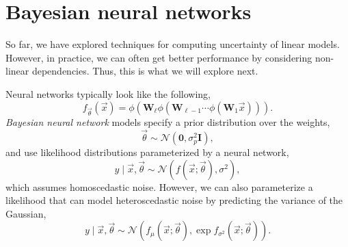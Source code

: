\section{Bayesian neural networks}

So far, we have explored techniques for computing uncertainty of linear
models. However, in practice, we can often get better performance by
considering non-linear dependencies. Thus, this is what we will explore next.

Neural networks typically look like the following, \[
  f_{\vec{\theta}}(\vec{x}) = \phi(\bm{W}_\ell \phi(\bm{W}_{\ell-1} \cdots \phi(\bm{W}_1\vec{x})))
.\]
\textit{Bayesian neural network} models specify a prior distribution over the
weights, \[
  \vec{\theta} \sim \mathcal{N}(\bm{0}, \sigma_p^2\bm{I})
,\]
and use likelihood distributions parameterized by a neural network, \[
  y\mid \vec{x},\vec{\theta} \sim \mathcal{N}(f(\vec{x};\vec{\theta}), \sigma^2)
,\]
which assumes homoscedastic noise.
However, we can also parameterize a likelihood that can model heteroscedastic
noise by predicting the variance of the Gaussian, \[
  y\mid \vec{x},\vec{\theta} \sim \mathcal{N}(f_{\mu}(\vec{x};\vec{\theta}), \exp f_{\sigma^2}(\vec{x};\vec{\theta}))
.\]

